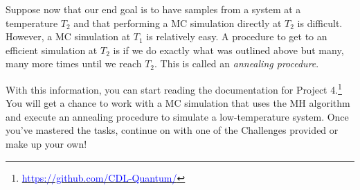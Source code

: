 \documentclass[12pt]{article}
\begin{document}
Suppose now that our end goal is to have samples from a system at a temperature $T_2$ and that performing a MC simulation directly at $T_2$ is difficult. However, a MC simulation at $T_1$ is relatively easy. A procedure to get to an efficient simulation at $T_2$ is if we do exactly what was outlined above but many, many more times until we reach $T_2$. This is called an {\it annealing procedure}.

With this information, you can start reading the documentation for Project 4.\footnote{\href{https://github.com/CDL-Quantum/CohortProject_2020/tree/master/Project_4_Ising_Annealer/}
{\textcolor{blue}{https://github.com/CDL-Quantum/}}} You will get a chance to work with a MC simulation that uses the MH algorithm and execute an annealing procedure to simulate a low-temperature system. Once you've mastered the tasks, continue on with one of the Challenges provided or make up your own!

\newpage



\end{document}
